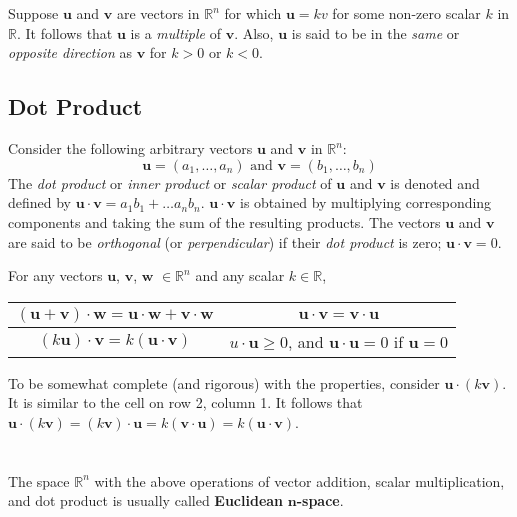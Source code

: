 \documentclass[../setup.tex]{subfiles}
\begin{document}
\phantom \\ \\
Suppose $\bm{u}$ and $\bm{v}$ are vectors in $\mathbb{R}^n$ for which $\bm{u} = kv$ for some non-zero scalar $k$ in $\mathbb{R}$. It follows that $\bm{u}$ is a \textit{multiple} of $\bm{v}$. Also, $\bm{u}$ is said to be in the \textit{same} or \textit{opposite direction} as $\bm{v}$ for $k > 0$ or $k < 0$.
\pagebreak


\subsection{Dot Product}
Consider the following arbitrary vectors $\bm{u}$ and $\bm{v}$ in $\mathbb{R}^n$:
\[\bm{u} = (a_1, \dots, a_n) \text{ and } \bm{v} = (b_1, \dots, b_n)\]
The \textit{dot product} or \textit{inner product} or \textit{scalar product} of $\bm{u}$ and $\bm{v}$ is denoted and defined by $\bm{u} \cdot \bm{v} = a_1b_1 + \dots a_nb_n$. $\bm{u} \cdot \bm{v}$ is obtained by multiplying corresponding components and taking the sum of the resulting products. The vectors $\bm{u}$ and $\bm{v}$ are said to be \textit{orthogonal} (or \textit{perpendicular}) if their \textit{dot product} is zero; $\bm{u} \cdot \bm{v} = 0$.
\begin{theorem}
For any vectors $\bm{u}$, $\bm{v}$, $\bm{w}$ $\in \mathbb{R}^n$ and any scalar $k \in \mathbb{R}$,
\begin{center}
\begin{tabular}[t]{| c | c |}
\hline
	$(\bm{u} + \bm{v}) \cdot \bm{w} = \bm{u} \cdot \bm{w} + \bm{v} \cdot \bm{w}$ & $\bm{u} \cdot \bm{v} = \bm{v} \cdot \bm{u}$ \\
\hline
	$(k\bm{u}) \cdot \bm{v} = k (\bm{u} \cdot \bm{v})$ & $u \cdot \bm{u} \geq 0$, and $\bm{u} \cdot \bm{u} = 0$ if $\bm{u} = 0$ \\
\hline
\end{tabular}
\end{center}
\end{theorem}
To be somewhat complete (and rigorous) with the properties, consider $\bm{u} \cdot (k\bm{v})$. It is similar to the cell on row 2, column 1. It follows that $\bm{u} \cdot (k\bm{v}) = (k\bm{v}) \cdot \bm{u} = k(\bm{v} \cdot \bm{u}) = k(\bm{u} \cdot \bm{v})$. \\
\phantom \\ \\
The space $\mathbb{R}^n$ with the above operations of vector addition, scalar multiplication, and dot product is usually called \textbf{Euclidean} $\boldsymbol{n}$\textbf{-space}. 
\end{document}
